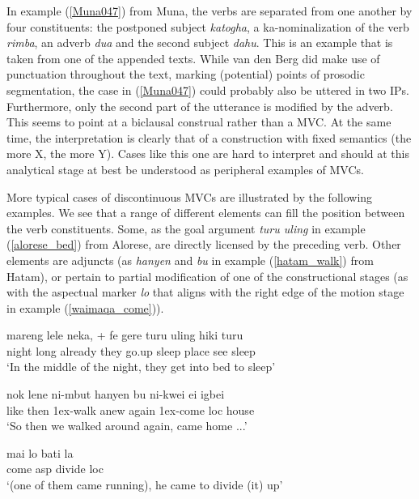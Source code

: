 In example (\ref{Muna047}) from Muna, the verbs are separated from one another by four constituents: the postponed subject \textit{katogha}, a ka-nominalization of the verb \textit{rimba}, an adverb \textit{dua} and the second subject \textit{dahu}. This is an example that is taken from one of the appended texts. While van den Berg did make use of punctuation throughout the text, marking (potential) points of prosodic segmentation, the case in (\ref{Muna047}) could probably also be uttered in two IPs. Furthermore, only the second part of the utterance is modified by the adverb. This seems to point at a biclausal construal rather than a MVC. At the same time, the interpretation is clearly that of a construction with fixed semantics (the more X, the more Y). Cases like this one are hard to interpret and should at this analytical stage at best be understood as peripheral examples of MVCs.

More typical cases of discontinuous MVCs are illustrated by the following examples. We see that a range of different elements can fill the position between the verb constituents. Some, as the goal argument \textit{turu uling} in example (\ref{alorese_bed}) from Alorese, are directly licensed by the preceding verb. Other elements are adjuncts (as \textit{hanyen} and \textit{bu} in example (\ref{hatam_walk}) from Hatam), or pertain to partial modification of one of the constructional stages (as with the aspectual marker \textit{lo} that aligns with the right edge of the motion stage in example (\ref{waimaqa_come})).

\ea \label{alorese_bed}
\gll mareng lele neka, + fe gere turu uling hiki turu \\
night long already they go.up sleep place see sleep \\
\glft `In the middle of the night, they get into bed to sleep' \\ 
\z
\xe

\ea \label{hatam_walk}
\gll nok lene ni-mbut hanyen bu ni-kwei ei igbei \\
like then 1\acs{ex}-walk anew again 1\acs{ex}-come \acs{loc} house \\
\glft `So then we walked around again, came home ...' \\ 
\z
\xe

\ea \label{waimaqa_come}
\gll mai lo bati la \\
come \acs{asp} divide \acs{loc} \\
\glft `(one of them came running), he came to divide (it) up' \\ 
\z
\xe

